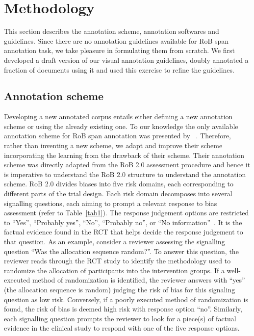 \documentclass[sn-mathphys,Numbered]{sn-jnl}%
\theoremstyle{thmstyleone}%
\theoremstyle{thmstyletwo}%
\theoremstyle{thmstylethree}%
\begin{document}
\section{Methodology}
\label{sec:methods}
%
This section describes the annotation scheme, annotation softwares and guidelines.
Since there are no annotation guidelines available for RoB span annotation task, we take pleasure in formulating them from scratch. 
We first developed a draft version of our visual annotation guidelines, doubly annotated a fraction of documents using it and used this exercise to refine the guidelines.

%
%
%
\subsection{Annotation scheme}
\label{annot_scheme}
%
Developing a new annotated corpus entails either defining a new annotation scheme or using the already existing one.
To our knowledge the only available annotation scheme for RoB span annotation was presented by ~\cite{dhrangadhariya2023first}.
Therefore, rather than inventing a new scheme, we adapt and improve their scheme incorporating the learning from the drawback of their scheme.
Their annotation scheme was directly adapted from the RoB 2.0 assessment procedure and hence it is imperative to understand the RoB 2.0 structure to understand the annotation scheme.
RoB 2.0 divides biases into five risk domains, each corresponding to different parts of the trial design.
Each risk domain decomposes into several signalling questions, each aiming to prompt a relevant response to bias assessment (refer to Table~\ref{tab1}).
The response judgement options are restricted to ``Yes'', ``Probably yes'', ``No'', ``Probably no'', or ``No information''~\cite{sterne2019rob}.
It is the factual evidence found in the RCT that helps decide the response judgement to that question.
As an example, consider a reviewer assessing the signalling question ``Was the allocation sequence random?''.
To answer this question, the reviewer reads through the RCT study to identify the methodology used to randomize the allocation of participants into the intervention groups.
If a well-executed method of randomization is identified, the reviewer answers with ``yes'' (the allocation sequence is random) judging the risk of bias for this signaling question as low risk.
Conversely, if a poorly executed method of randomization is found, the risk of bias is deemed  high risk with response option ``no''.
Similarly, each signalling question prompts the reviewer to look for a piece(s) of factual evidence in the clinical study to respond with one of the five response options.
\end{document}
